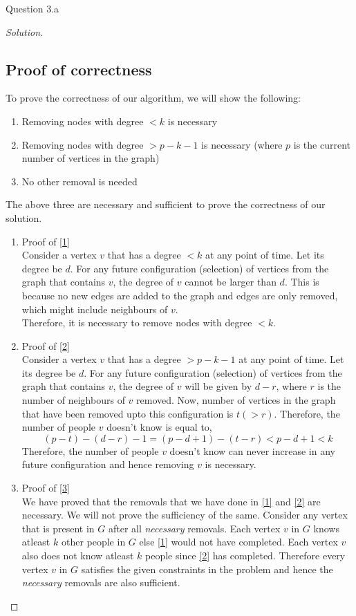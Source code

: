 \begin{solution}{Question 3.a}
\begin{proof}[Solution]
        \subsection*{Proof of correctness}
        To prove the correctness of our algorithm, we will show the following:
        \begin{enumerate}
            \item{Removing nodes with degree $<k$ is necessary}\label{1}
            \item{Removing nodes with degree $>p-k-1$ is necessary (where $p$ is the current number of vertices in the graph)}\label{2}
            \item{No other removal is needed}\label{3}
        \end{enumerate}
        The above three are necessary and sufficient to prove the correctness of our solution.
        \begin{enumerate}
            \item{Proof of \ref{1}}\\
                Consider a vertex $v$ that has a degree $<k$ at any point of time. Let its degree be $d$. For any future configuration (selection) of vertices from the graph that contains $v$, the degree of $v$ cannot be larger than $d$. This is because no new edges are added to the graph and edges are only removed, which might include neighbours of $v$.\\
                Therefore, it is necessary to remove nodes with degree $<k$.
            \item{Proof of \ref{2}}\\
                Consider a vertex $v$ that has a degree $>p-k-1$ at any point of time. Let its degree be $d$. For any future configuration (selection) of vertices from the graph that contains $v$, the degree of $v$ will be given by $d-r$, where $r$ is the number of neighbours of $v$ removed. Now, number of vertices in the graph that have been removed upto this configuration is $t (>r)$. Therefore, the number of people $v$ doesn't know is equal to,
                \begin{equation}
                    (p-t)-(d-r)-1=(p-d+1)-(t-r)<p-d+1<k
                \end{equation}
                Therefore, the number of people $v$ doesn't know can never increase in any future configuration and hence removing $v$ is necessary.
            \item{Proof of \ref{3}}\\
                We have proved that the removals that we have done in \ref{1} and \ref{2} are necessary. We will not prove the sufficiency of the same. Consider any vertex that is present in $G$ after all \textit{necessary} removals. Each vertex $v$ in $G$ knows atleast $k$ other people in $G$ else \ref{1} would not have completed. Each vertex $v$ also does not know atleast $k$ people since \ref{2} has completed. Therefore every vertex $v$ in $G$ satisfies the given constraints in the problem and hence the \textit{necessary} removals are also sufficient.

\end{enumerate}
\end{proof}
\end{solution}

